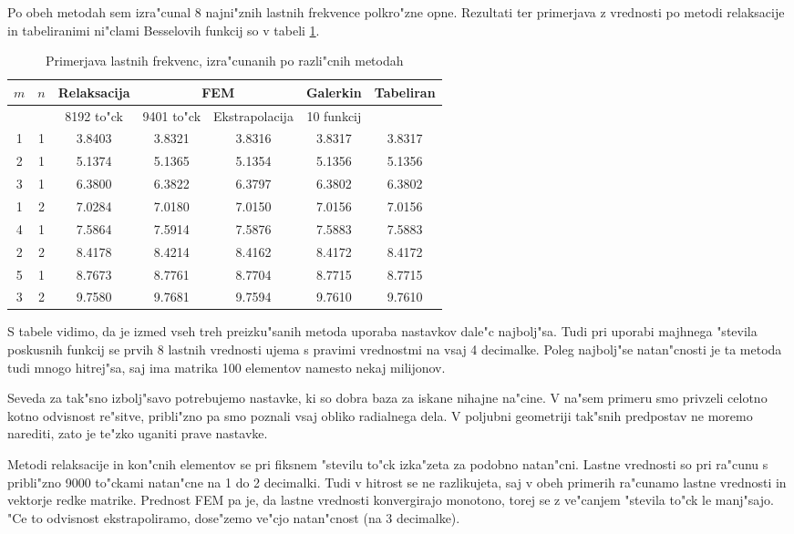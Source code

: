 \documentclass[a4paper,10pt]{article}
\begin{document}
Po obeh metodah sem izra"cunal 8 najni"znih lastnih frekvence polkro"zne opne. Rezultati ter primerjava z vrednosti po metodi relaksacije in tabeliranimi ni"clami Besselovih funkcij so v tabeli \ref{tab:rezultati}. 

\begin{table}[H]
 \centering
  \begin{tabular}{|c|c|c|c|c|c|c|}
  \hline
    $m$ & $n$ & Relaksacija & \multicolumn{2}{|c|}{FEM} & Galerkin & Tabeliran \\
    \hline
    & & 8192 to"ck & 9401 to"ck & Ekstrapolacija & 10 funkcij & \\
    \hline
    1 & 1 & 3.8403 & 3.8321 & 3.8316 & 3.8317 & 3.8317 \\
    2 & 1 & 5.1374 & 5.1365 & 5.1354 & 5.1356 & 5.1356 \\
    3 & 1 & 6.3800 & 6.3822 & 6.3797 & 6.3802 & 6.3802 \\
    1 & 2 & 7.0284 & 7.0180 & 7.0150 & 7.0156 & 7.0156 \\
    4 & 1 & 7.5864 & 7.5914 & 7.5876 & 7.5883 & 7.5883 \\
    2 & 2 & 8.4178 & 8.4214 & 8.4162 & 8.4172 & 8.4172 \\
    5 & 1 & 8.7673 & 8.7761 & 8.7704 & 8.7715 & 8.7715 \\
    3 & 2 & 9.7580 & 9.7681 & 9.7594 & 9.7610 & 9.7610 \\
    \hline
  \end{tabular}
  \caption{Primerjava lastnih frekvenc, izra"cunanih po razli"cnih metodah}
  \label{tab:rezultati}
\end{table}

S tabele vidimo, da je izmed vseh treh preizku"sanih metoda uporaba nastavkov dale"c najbolj"sa. Tudi pri uporabi majhnega "stevila poskusnih funkcij se prvih 8 lastnih vrednosti ujema s pravimi vrednostmi na vsaj 4 decimalke. Poleg najbolj"se natan"cnosti je ta metoda tudi mnogo hitrej"sa, saj ima matrika 100 elementov namesto nekaj milijonov. 

Seveda za tak"sno izbolj"savo potrebujemo nastavke, ki so dobra baza za iskane nihajne na"cine. V na"sem primeru smo privzeli celotno kotno odvisnost re"sitve, pribli"zno pa smo poznali vsaj obliko radialnega dela. V poljubni geometriji tak"snih predpostav ne moremo narediti, zato je te"zko uganiti prave nastavke. 

Metodi relaksacije in kon"cnih elementov se pri fiksnem "stevilu to"ck izka"zeta za podobno natan"cni. Lastne vrednosti so pri ra"cunu s pribli"zno 9000 to"ckami natan"cne na 1 do 2 decimalki. Tudi v hitrost se ne razlikujeta, saj v obeh primerih ra"cunamo lastne vrednosti in vektorje redke matrike. Prednost FEM pa je, da lastne vrednosti konvergirajo monotono, torej se z ve"canjem "stevila to"ck le manj"sajo. "Ce to odvisnost ekstrapoliramo, dose"zemo ve"cjo natan"cnost (na 3 decimalke). 
\end{document}

